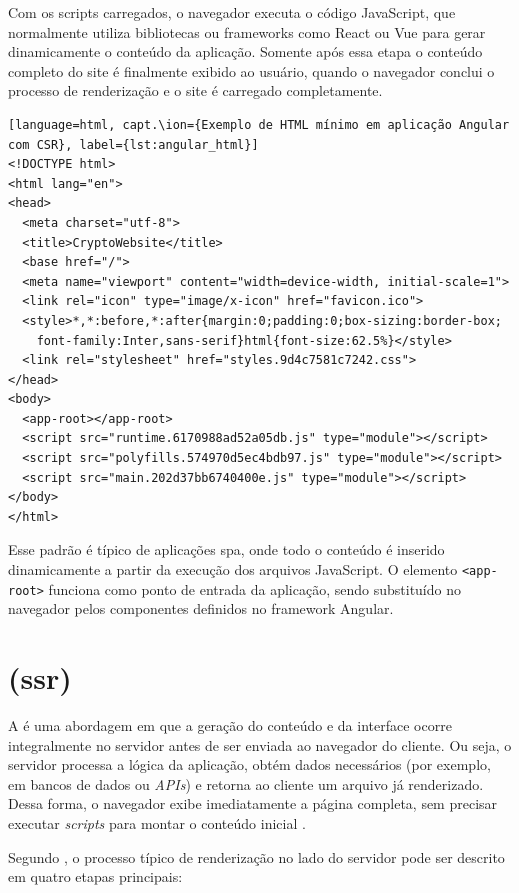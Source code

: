 Com os scripts carregados, o navegador executa o código JavaScript, que normalmente utiliza bibliotecas ou frameworks como React ou Vue para gerar dinamicamente o conteúdo da aplicação. Somente após essa etapa o conteúdo completo do site é finalmente exibido ao usuário, quando o navegador conclui o processo de renderização e o site é carregado completamente.

\begin{lstlisting}[language=html, capt.\ion={Exemplo de HTML mínimo em aplicação Angular com CSR}, label={lst:angular_html}]
<!DOCTYPE html>
<html lang="en">
<head>
  <meta charset="utf-8">
  <title>CryptoWebsite</title>
  <base href="/">
  <meta name="viewport" content="width=device-width, initial-scale=1">
  <link rel="icon" type="image/x-icon" href="favicon.ico">
  <style>*,*:before,*:after{margin:0;padding:0;box-sizing:border-box;
    font-family:Inter,sans-serif}html{font-size:62.5%}</style>
  <link rel="stylesheet" href="styles.9d4c7581c7242.css">
</head>
<body>
  <app-root></app-root>
  <script src="runtime.6170988ad52a05db.js" type="module"></script>
  <script src="polyfills.574970d5ec4bdb97.js" type="module"></script>
  <script src="main.202d37bb6740400e.js" type="module"></script>
</body>
</html>
\end{lstlisting}

Esse padrão é típico de aplicações \acrshort{spa}, onde todo o conteúdo é inserido dinamicamente a partir da execução dos arquivos JavaScript. O elemento \texttt{<app-root>} funciona como ponto de entrada da aplicação, sendo substituído no navegador pelos componentes definidos no framework Angular. {\cite{atori2024}}


\section{ (\acrshort{ssr})}
\label{subsec:ssr}

A \textbf{} é uma abordagem em que a geração do conteúdo e da interface ocorre integralmente no servidor antes de ser enviada ao navegador do cliente. Ou seja, o servidor processa a lógica da aplicação, obtém dados necessários (por exemplo, em bancos de dados ou \emph{APIs}) e retorna ao cliente um arquivo  já renderizado. Dessa forma, o navegador exibe imediatamente a página completa, sem precisar executar \emph{scripts} para montar o conteúdo inicial \cite{atori2024}. 

Segundo , o processo típico de renderização no lado do servidor pode ser descrito em quatro etapas principais:

